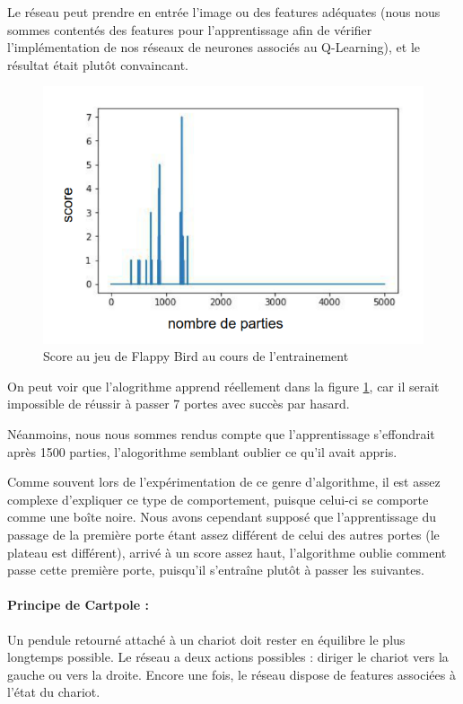 \documentclass[
    10pt,
    a4paper,
    oneside,
    headinclude,footinclude,
    BCOR=5mm,
    captions=tableabove
]{scrartcl}
\begin{document}
Le réseau peut prendre en entrée l’image ou des features adéquates (nous nous sommes contentés des features pour l’apprentissage afin de vérifier l’implémentation de nos réseaux de neurones associés au Q-Learning), et le résultat était plutôt convaincant.

\begin{figure}
\includegraphics[width=\linewidth]{flappy-bird.png}
\centering
\caption{Score au jeu de Flappy Bird au cours de l'entrainement}
\label{fig:flappy-bird}
\end{figure}

On peut voir que l'alogrithme apprend réellement dans la figure \ref{fig:flappy-bird}, car il serait impossible de réussir à passer 7 portes avec succès par hasard.

Néanmoins, nous nous sommes rendus compte que l'apprentissage s'effondrait après 1500 parties, l'alogorithme semblant oublier ce qu'il avait appris.

Comme souvent lors de l'expérimentation de ce genre d'algorithme, il est assez complexe d'expliquer ce type de comportement, puisque celui-ci se comporte comme une boîte noire.
Nous avons cependant supposé que l'apprentissage du passage de la première porte étant assez différent de celui des autres portes (le plateau est différent), arrivé à un score assez haut, l'algorithme oublie comment passe cette première porte, puisqu'il s'entraîne plutôt à passer les suivantes.

\paragraph{Principe de Cartpole :}
Un pendule retourné attaché à un chariot doit rester en équilibre le plus longtemps possible. Le réseau a deux actions possibles : diriger le chariot vers la gauche ou vers la droite. Encore une fois, le réseau dispose de features associées à l’état du chariot.
\end{document}

